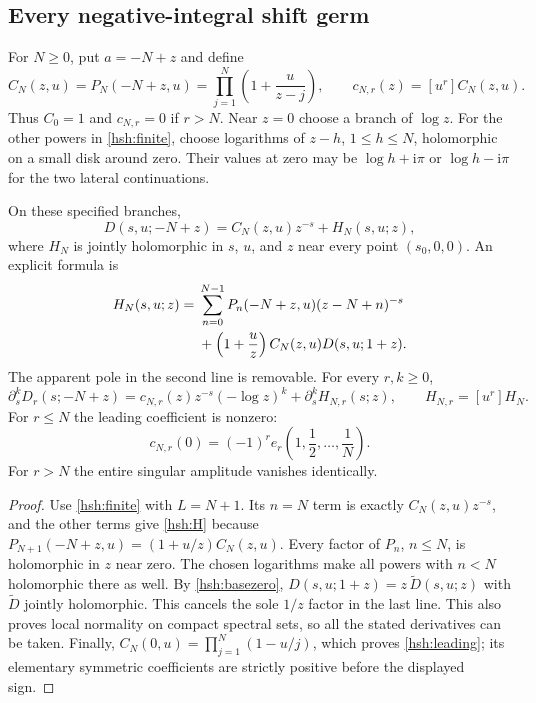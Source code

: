 \subsection{Every negative-integral shift germ}

For $N\geq0$, put $a=-N+z$ and define
\begin{equation}\label{hsh:C}
 C_N(z,u)=P_N(-N+z,u)
          =\prod_{j=1}^{N}\left(1+\frac{u}{z-j}\right),
 \qquad c_{N,r}(z)=[u^r]C_N(z,u).
\end{equation}
Thus $C_0=1$ and $c_{N,r}=0$ if $r>N$.  Near $z=0$ choose
a branch of $\log z$.  For the other powers in
\eqref{hsh:finite}, choose logarithms of $z-h$, $1\leq h\leq N$,
holomorphic on a small disk around zero.  Their values at zero may be
$\log h+\mathrm i\pi$ or $\log h-\mathrm i\pi$ for the two lateral
continuations.

\begin{theorem}\label{hsh:germ}
On these specified branches,
\begin{equation}\label{hsh:local}
 D(s,u;-N+z)=C_N(z,u)z^{-s}+H_N(s,u;z),
\end{equation}
where $H_N$ is jointly holomorphic in $s$, $u$, and $z$ near
every point $(s_0,0,0)$.  An explicit formula is
\begin{align}
 H_N(s,u;z)={}&
 \sum_{n=0}^{N-1}P_n(-N+z,u)(z-N+n)^{-s}\notag\\
 &+\left(1+\frac uz\right)C_N(z,u)D(s,u;1+z).
                                                     \label{hsh:H}
\end{align}
The apparent pole in the second line is removable.  For every
$r,k\geq0$,
\begin{equation}\label{hsh:localjets}
 \partial_s^kD_r(s;-N+z)
   =c_{N,r}(z)z^{-s}(-\log z)^k
                         +\partial_s^kH_{N,r}(s;z),
 \qquad H_{N,r}=[u^r]H_N.
\end{equation}
For $r\leq N$ the leading coefficient is nonzero:
\begin{equation}\label{hsh:leading}
 c_{N,r}(0)=(-1)^r e_r\left(1,\frac12,\ldots,\frac1N\right).
\end{equation}
For $r>N$ the entire singular amplitude vanishes identically.
\end{theorem}

\begin{proof}
Use \eqref{hsh:finite} with $L=N+1$.  Its $n=N$ term is exactly
$C_N(z,u)z^{-s}$, and the other terms give \eqref{hsh:H} because
$P_{N+1}(-N+z,u)=(1+u/z)C_N(z,u)$.
Every factor of $P_n$, $n\leq N$, is holomorphic in $z$ near
zero.  The chosen logarithms make all powers with $n<N$
holomorphic there as well.  By \eqref{hsh:basezero},
$D(s,u;1+z)=z\,\widetilde D(s,u;z)$ with $\widetilde D$
jointly holomorphic.  This cancels the sole $1/z$ factor in the
last line.  This also proves local normality on compact spectral
sets, so all the stated derivatives can be taken.  Finally,
$C_N(0,u)=\prod_{j=1}^{N}(1-u/j)$, which proves
\eqref{hsh:leading}; its elementary symmetric coefficients are
strictly positive before the displayed sign.
\end{proof}

